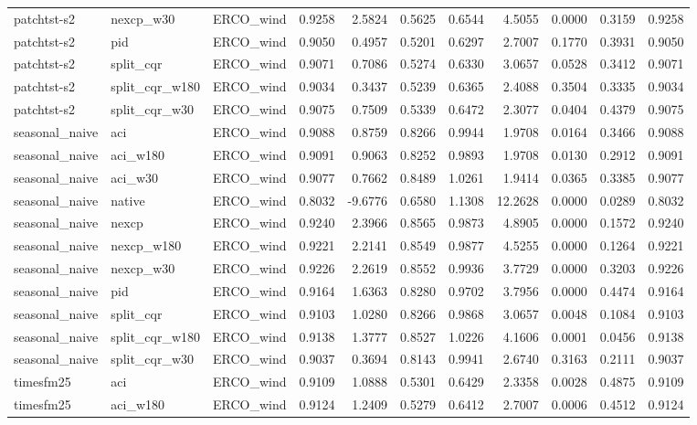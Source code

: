 \begin{tabular}{lllrrrrrrrr}
patchtst-s2 & nexcp_w30 & ERCO_wind & 0.9258 & 2.5824 & 0.5625 & 0.6544 & 4.5055 & 0.0000 & 0.3159 & 0.9258 \\
patchtst-s2 & pid & ERCO_wind & 0.9050 & 0.4957 & 0.5201 & 0.6297 & 2.7007 & 0.1770 & 0.3931 & 0.9050 \\
patchtst-s2 & split_cqr & ERCO_wind & 0.9071 & 0.7086 & 0.5274 & 0.6330 & 3.0657 & 0.0528 & 0.3412 & 0.9071 \\
patchtst-s2 & split_cqr_w180 & ERCO_wind & 0.9034 & 0.3437 & 0.5239 & 0.6365 & 2.4088 & 0.3504 & 0.3335 & 0.9034 \\
patchtst-s2 & split_cqr_w30 & ERCO_wind & 0.9075 & 0.7509 & 0.5339 & 0.6472 & 2.3077 & 0.0404 & 0.4379 & 0.9075 \\
seasonal_naive & aci & ERCO_wind & 0.9088 & 0.8759 & 0.8266 & 0.9944 & 1.9708 & 0.0164 & 0.3466 & 0.9088 \\
seasonal_naive & aci_w180 & ERCO_wind & 0.9091 & 0.9063 & 0.8252 & 0.9893 & 1.9708 & 0.0130 & 0.2912 & 0.9091 \\
seasonal_naive & aci_w30 & ERCO_wind & 0.9077 & 0.7662 & 0.8489 & 1.0261 & 1.9414 & 0.0365 & 0.3385 & 0.9077 \\
seasonal_naive & native & ERCO_wind & 0.8032 & -9.6776 & 0.6580 & 1.1308 & 12.2628 & 0.0000 & 0.0289 & 0.8032 \\
seasonal_naive & nexcp & ERCO_wind & 0.9240 & 2.3966 & 0.8565 & 0.9873 & 4.8905 & 0.0000 & 0.1572 & 0.9240 \\
seasonal_naive & nexcp_w180 & ERCO_wind & 0.9221 & 2.2141 & 0.8549 & 0.9877 & 4.5255 & 0.0000 & 0.1264 & 0.9221 \\
seasonal_naive & nexcp_w30 & ERCO_wind & 0.9226 & 2.2619 & 0.8552 & 0.9936 & 3.7729 & 0.0000 & 0.3203 & 0.9226 \\
seasonal_naive & pid & ERCO_wind & 0.9164 & 1.6363 & 0.8280 & 0.9702 & 3.7956 & 0.0000 & 0.4474 & 0.9164 \\
seasonal_naive & split_cqr & ERCO_wind & 0.9103 & 1.0280 & 0.8266 & 0.9868 & 3.0657 & 0.0048 & 0.1084 & 0.9103 \\
seasonal_naive & split_cqr_w180 & ERCO_wind & 0.9138 & 1.3777 & 0.8527 & 1.0226 & 4.1606 & 0.0001 & 0.0456 & 0.9138 \\
seasonal_naive & split_cqr_w30 & ERCO_wind & 0.9037 & 0.3694 & 0.8143 & 0.9941 & 2.6740 & 0.3163 & 0.2111 & 0.9037 \\
timesfm25 & aci & ERCO_wind & 0.9109 & 1.0888 & 0.5301 & 0.6429 & 2.3358 & 0.0028 & 0.4875 & 0.9109 \\
timesfm25 & aci_w180 & ERCO_wind & 0.9124 & 1.2409 & 0.5279 & 0.6412 & 2.7007 & 0.0006 & 0.4512 & 0.9124 \\

\end{tabular}
